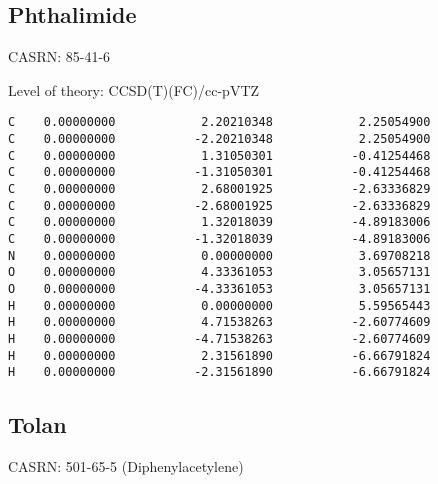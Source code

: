 \documentclass[journal=jctcce,manuscript=article,layout=traditional]{achemso}
\newcommand{\TZ}{cc-pVTZ}
\begin{document}
\subsection{Phthalimide}

CASRN:  85-41-6

\begin{singlespace}
\noindent  Level of theory: CCSD(T)(FC)/{\TZ}
\begin{verbatim}
C    0.00000000            2.20210348            2.25054900
C    0.00000000           -2.20210348            2.25054900
C    0.00000000            1.31050301           -0.41254468
C    0.00000000           -1.31050301           -0.41254468
C    0.00000000            2.68001925           -2.63336829
C    0.00000000           -2.68001925           -2.63336829
C    0.00000000            1.32018039           -4.89183006
C    0.00000000           -1.32018039           -4.89183006
N    0.00000000            0.00000000            3.69708218
O    0.00000000            4.33361053            3.05657131
O    0.00000000           -4.33361053            3.05657131
H    0.00000000            0.00000000            5.59565443
H    0.00000000            4.71538263           -2.60774609
H    0.00000000           -4.71538263           -2.60774609
H    0.00000000            2.31561890           -6.66791824
H    0.00000000           -2.31561890           -6.66791824
\end{verbatim}
\end{singlespace}



\subsection{Tolan}

CASRN:  501-65-5 (Diphenylacetylene)
\end{document}
